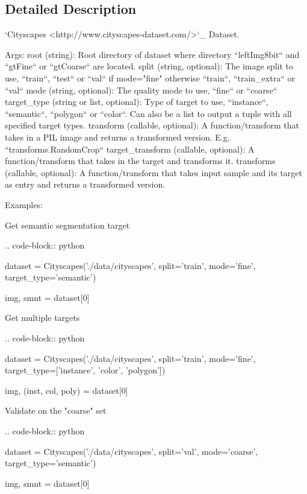 \subsection{Detailed Description}
\begin{DoxyVerb}`Cityscapes <http://www.cityscapes-dataset.com/>`_ Dataset.

Args:
    root (string): Root directory of dataset where directory ``leftImg8bit``
        and ``gtFine`` or ``gtCoarse`` are located.
    split (string, optional): The image split to use, ``train``, ``test`` or ``val`` if mode="fine"
        otherwise ``train``, ``train_extra`` or ``val``
    mode (string, optional): The quality mode to use, ``fine`` or ``coarse``
    target_type (string or list, optional): Type of target to use, ``instance``, ``semantic``, ``polygon``
        or ``color``. Can also be a list to output a tuple with all specified target types.
    transform (callable, optional): A function/transform that takes in a PIL image
        and returns a transformed version. E.g, ``transforms.RandomCrop``
    target_transform (callable, optional): A function/transform that takes in the
        target and transforms it.
    transforms (callable, optional): A function/transform that takes input sample and its target as entry
        and returns a transformed version.

Examples:

    Get semantic segmentation target

    .. code-block:: python

        dataset = Cityscapes('./data/cityscapes', split='train', mode='fine',
                             target_type='semantic')

        img, smnt = dataset[0]

    Get multiple targets

    .. code-block:: python

        dataset = Cityscapes('./data/cityscapes', split='train', mode='fine',
                             target_type=['instance', 'color', 'polygon'])

        img, (inst, col, poly) = dataset[0]

    Validate on the "coarse" set

    .. code-block:: python

        dataset = Cityscapes('./data/cityscapes', split='val', mode='coarse',
                             target_type='semantic')

        img, smnt = dataset[0]
\end{DoxyVerb}
 

